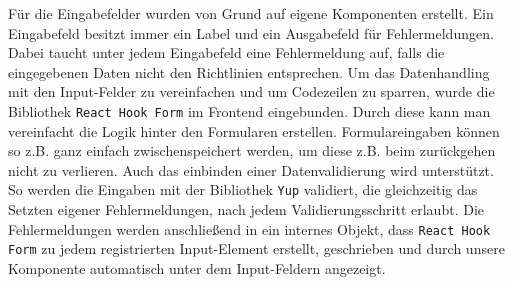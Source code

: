 \documentclass[conference,a4paper,flushend]{cs-techrep}
\begin{document}
\begin{enumerate}
Für die Eingabefelder wurden von Grund auf eigene Komponenten erstellt. Ein Eingabefeld besitzt immer ein Label und ein Ausgabefeld für Fehlermeldungen. Dabei taucht unter jedem Eingabefeld eine Fehlermeldung auf, falls die eingegebenen Daten nicht den Richtlinien entsprechen. 
Um das Datenhandling mit den Input-Felder zu vereinfachen und um Codezeilen zu sparren, wurde die Bibliothek \texttt{React Hook Form} im Frontend eingebunden. Durch diese kann man vereinfacht die Logik hinter den Formularen erstellen. 
Formulareingaben können so z.B. ganz einfach zwischenspeichert werden, um diese z.B. beim zurückgehen nicht zu verlieren. Auch das einbinden einer Datenvalidierung wird unterstützt. So werden die Eingaben mit der Bibliothek \texttt{Yup} validiert, die gleichzeitig das Setzten eigener Fehlermeldungen, nach jedem Validierungsschritt erlaubt. Die Fehlermeldungen werden anschließend in ein internes Objekt, dass \texttt{React Hook Form} zu jedem registrierten Input-Element erstellt, geschrieben und durch unsere Komponente automatisch unter dem Input-Feldern angezeigt. 


\end{enumerate}
\end{document}
